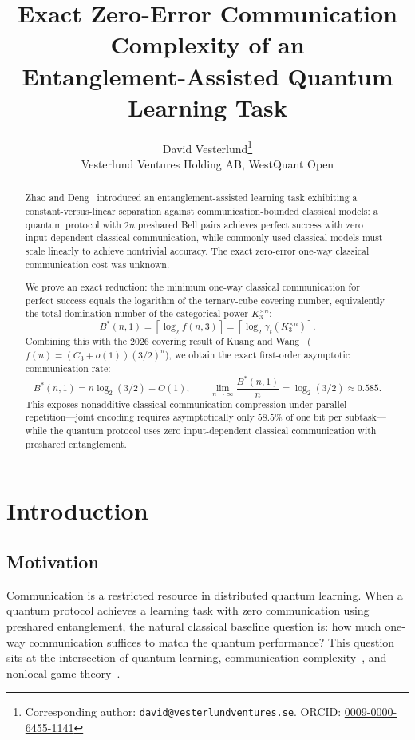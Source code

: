 \documentclass[11pt,letterpaper]{article}
\title{Exact Zero-Error Communication Complexity of an\\
Entanglement-Assisted Quantum Learning Task}
\author{%
  David Vesterlund\thanks{Corresponding author: \texttt{david@vesterlundventures.se}. ORCID: \href{https://orcid.org/0009-0000-6455-1141}{0009-0000-6455-1141}} \\
  Vesterlund Ventures Holding AB, WestQuant Open
}
\date{}
\newcommand{\gammat}{\gamma_t}
\newcommand{\Bstar}{B^{\!*}}
\begin{document}
\maketitle

\begin{abstract}
Zhao and Deng~\cite{zhaodeng2025} introduced an entanglement-assisted learning task exhibiting a constant-versus-linear separation against communication-bounded classical models: a quantum protocol with $2n$ preshared Bell pairs achieves perfect success with zero input-dependent classical communication, while commonly used classical models must scale linearly to achieve nontrivial accuracy. The exact zero-error one-way classical communication cost was unknown.

We prove an exact reduction: the minimum one-way classical communication for perfect success equals the logarithm of the ternary-cube covering number, equivalently the total domination number of the categorical power $K_3^{\times n}$:
\[
  \Bstar(n,1) = \left\lceil \log_2 f(n,3) \right\rceil = \left\lceil \log_2 \gammat(K_3^{\times n}) \right\rceil.
\]
Combining this with the 2026 covering result of Kuang and Wang~\cite{kuangwang2026} ($f(n) = (C_3 + o(1))(3/2)^n$), we obtain the exact first-order asymptotic communication rate:
\[
  \Bstar(n,1) = n \log_2(3/2) + O(1), \qquad \lim_{n\to\infty} \frac{\Bstar(n,1)}{n} = \log_2(3/2) \approx 0.585.
\]
This exposes nonadditive classical communication compression under parallel repetition---joint encoding requires asymptotically only $58.5\%$ of one bit per subtask---while the quantum protocol uses zero input-dependent classical communication with preshared entanglement.
\end{abstract}

\section{Introduction}
\label{sec:intro}

\subsection{Motivation}

Communication is a restricted resource in distributed quantum learning. When a quantum protocol achieves a learning task with zero communication using preshared entanglement, the natural classical baseline question is: how much one-way communication suffices to match the quantum performance? This question sits at the intersection of quantum learning, communication complexity~\cite{buhrman2010}, and nonlocal game theory~\cite{cleve2004,brassard2005}.
\end{document}
